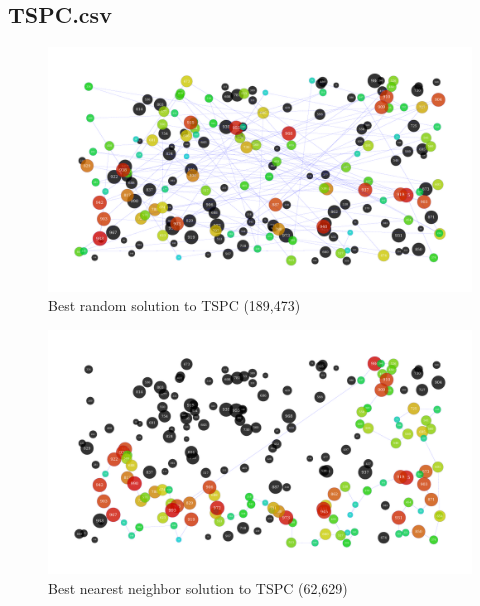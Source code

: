 \documentclass[14pt]{article}
\begin{document}
\subsection{TSPC.csv}
\begin{figure}[H]
	\begin{adjustwidth}{-3em}{0}
		\includegraphics{results/best_random_TSPC.pdf}
	\end{adjustwidth}
	\vspace{-15mm}
	\caption{Best random solution to TSPC (189,473)}
\end{figure}
\begin{figure}[H]
	\begin{adjustwidth}{-3em}{0}
		\includegraphics{results/best_nearest-neighbor_TSPC.pdf}
	\end{adjustwidth}
	\vspace{-15mm}
	\caption{Best nearest neighbor solution to TSPC (62,629)}
\end{figure}
\end{document}

